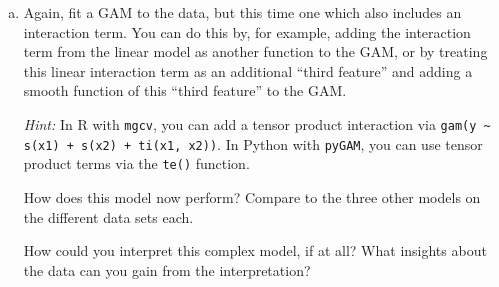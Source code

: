 {\begin{enumerate}[a)]
    What can you conclude about the different data sets?
    In particular, given your observations from all three models, do you consider any of the three data sets to be modeled very well by any of the models so far?

    \item
    Again, fit a GAM to the data, but this time one which also includes an interaction term.
    You can do this by, for example, adding the interaction term from the linear model as another function to the GAM, or by treating this linear interaction term as an additional ``third feature'' and adding a smooth function of this ``third feature'' to the GAM.

    \textit{Hint:} In R with \texttt{mgcv}, you can add a tensor product interaction via \texttt{gam(y \textasciitilde{} s(x1) + s(x2) + ti(x1, x2))}. In Python with \texttt{pyGAM}, you can use tensor product terms via the \texttt{te()} function.

    How does this model now perform?
    Compare to the three other models on the different data sets each.
    
    How could you interpret this complex model, if at all? What insights about the data can you gain from the interpretation?
\end{enumerate}

}